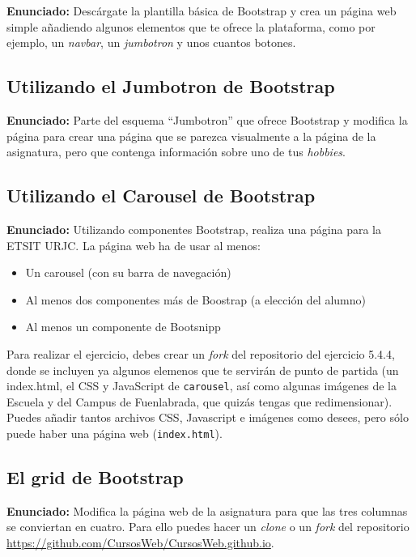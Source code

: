 \textbf{Enunciado:} Descárgate la plantilla básica de Bootstrap y 
crea un página web simple añadiendo algunos elementos que te ofrece la
plataforma, como por ejemplo, un \emph{navbar}, un \emph{jumbotron} y unos
cuantos botones.


\subsection{Utilizando el Jumbotron de Bootstrap}
\label{subsec:jumbotron}

\textbf{Enunciado:} Parte del esquema ``Jumbotron'' que ofrece Bootstrap
y modifica la página para crear una página que se parezca visualmente a la
página de la asignatura, pero que contenga información sobre uno de tus
\emph{hobbies}.

\subsection{Utilizando el Carousel de Bootstrap}
\label{subsec:carousel}

\textbf{Enunciado:} Utilizando componentes Bootstrap, realiza una página para la ETSIT URJC. La página web ha de usar al menos:

\begin{itemize}
   \item Un carousel (con su barra de navegación)
   \item Al menos dos componentes más de Boostrap (a elección del alumno)
   \item Al menos un componente de Bootsnipp
\end{itemize}

Para realizar el ejercicio, debes crear un \emph{fork} del repositorio del ejercicio 5.4.4, donde se incluyen ya algunos elemenos que te servirán de punto de partida (un index.html, el CSS y JavaScript de \texttt{carousel}, así como algunas imágenes de la Escuela y del Campus de Fuenlabrada, que quizás tengas que redimensionar). Puedes añadir tantos archivos CSS, Javascript e imágenes como desees, pero sólo puede haber una página web (\texttt{index.html}).

\subsection{El grid de Bootstrap}
\label{subsec:grid-bootstrap}

\textbf{Enunciado:} Modifica la página web de la asignatura para que las tres columnas
se conviertan en cuatro. Para ello puedes hacer un \emph{clone} o un \emph{fork} del
repositorio \url{https://github.com/CursosWeb/CursosWeb.github.io}.

